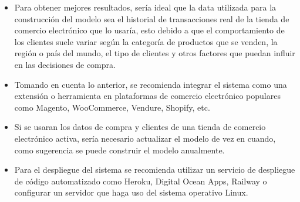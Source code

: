 \begin{itemize}
	\item Para obtener mejores resultados, sería ideal que la data utilizada para la construcción del modelo sea el historial de transacciones real de la tienda de comercio electrónico que lo usaría, esto debido a que el comportamiento de los clientes suele variar según la categoría de productos que se venden, la región o país del mundo, el tipo de clientes y otros factores que puedan influir en las decisiones de compra.
	\item Tomando en cuenta lo anterior, se recomienda integrar el sistema como una extensión o herramienta en plataformas de comercio electrónico populares como Magento, WooCommerce, Vendure, Shopify, etc.
	\item Si se usaran los datos de compra y clientes de una tienda de comercio electrónico activa, sería necesario actualizar el modelo de vez en cuando, como sugerencia se puede  construir el modelo anualmente.
	\item Para el despliegue del sistema se recomienda utilizar un servicio de despliegue de código automatizado como Heroku, Digital Ocean Apps, Railway o configurar un servidor que haga uso del sistema operativo Linux.

\end{itemize}
